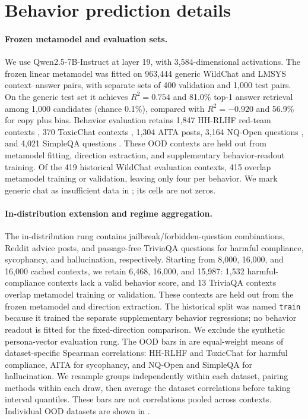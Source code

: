 \section{Behavior prediction details}
\label{app:behavior}

\paragraph{Frozen metamodel and evaluation sets.} We use Qwen2.5-7B-Instruct at layer 19, with 3,584-dimensional activations. The frozen linear metamodel was fitted on 963,444 generic WildChat and LMSYS context--answer pairs, with separate sets of 400 validation and 1,000 test pairs. On the generic test set it achieves $R^2=0.754$ and 81.0\% top-1 answer retrieval among 1,000 candidates (chance 0.1\%), compared with $R^2=-0.920$ and 56.9\% for copy plus bias. Behavior evaluation retains 1,847 HH-RLHF red-team contexts \citep{ganguli2022redteaming}, 370 ToxicChat contexts \citep{lin2023toxicchat}, 1,304 AITA posts, 3,164 NQ-Open questions \citep{kwiatkowski2019nq,lee2019latent}, and 4,021 SimpleQA questions \citep{wei2024simpleqa}. These OOD contexts are held out from metamodel fitting, direction extraction, and supplementary behavior-readout training. Of the 419 historical WildChat evaluation contexts, 415 overlap metamodel training or validation, leaving only four per behavior. We mark generic chat as insufficient data in ; its cells are not zeros.

\paragraph{In-distribution extension and regime aggregation.} The in-distribution rung contains jailbreak/forbidden-question combinations, Reddit advice posts, and passage-free TriviaQA questions for harmful compliance, sycophancy, and hallucination, respectively. Starting from 8,000, 16,000, and 16,000 cached contexts, we retain 6,468, 16,000, and 15,987: 1,532 harmful-compliance contexts lack a valid behavior score, and 13 TriviaQA contexts overlap metamodel training or validation. These contexts are held out from the frozen metamodel and direction extraction. The historical split was named \texttt{train} because it trained the separate supplementary behavior regressions; no behavior readout is fitted for the fixed-direction comparison. We exclude the synthetic persona-vector evaluation rung. The OOD bars in  are equal-weight means of dataset-specific Spearman correlations: HH-RLHF and ToxicChat for harmful compliance, AITA for sycophancy, and NQ-Open and SimpleQA for hallucination. We resample groups independently within each dataset, pairing methods within each draw, then average the dataset correlations before taking interval quantiles. These bars are not correlations pooled across contexts. Individual OOD datasets are shown in .

